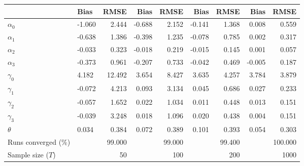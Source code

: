 
\begin{tabular}[t]{llrrrrrrr}
\toprule
  & Bias & RMSE & Bias & RMSE & Bias & RMSE & Bias & RMSE\\
\midrule
$\alpha_{0}$ & -1.060 & 2.444 & -0.688 & 2.152 & -0.141 & 1.368 & 0.008 & 0.559\\
$\alpha_{1}$ & -0.638 & 1.386 & -0.398 & 1.235 & -0.078 & 0.785 & 0.002 & 0.317\\
$\alpha_{2}$ & -0.033 & 0.323 & -0.018 & 0.219 & -0.015 & 0.145 & 0.001 & 0.057\\
$\alpha_{3}$ & -0.373 & 0.961 & -0.207 & 0.733 & -0.042 & 0.469 & -0.005 & 0.187\\
$\gamma_{0}$ & 4.182 & 12.492 & 3.654 & 8.427 & 3.635 & 4.257 & 3.784 & 3.879\\
$\gamma_{1}$ & -0.072 & 4.213 & 0.093 & 3.134 & 0.045 & 0.686 & 0.027 & 0.233\\
$\gamma_{2}$ & -0.057 & 1.652 & 0.022 & 1.034 & 0.011 & 0.448 & 0.013 & 0.151\\
$\gamma_{3}$ & -0.039 & 3.248 & 0.018 & 1.096 & 0.020 & 0.438 & 0.004 & 0.151\\
$\theta$ & 0.034 & 0.384 & 0.072 & 0.389 & 0.101 & 0.393 & 0.054 & 0.303\\
Runs converged (\%) &  & 99.000 &  & 99.000 &  & 99.400 &  & 100.000\\
Sample size ($T$) &  & 50 &  & 100 &  & 200 &  & 1000\\
\bottomrule
\end{tabular}
